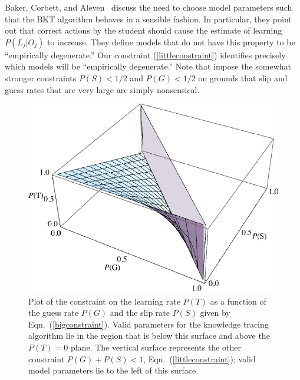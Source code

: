 \documentclass[jedm,acmnow]{acmtrans2m}
\begin{document}
Baker, Corbett, and Aleven~\citeyear{baker_more_2008} discuss the need
to choose model parameters such that the BKT algorithm behaves in a sensible
fashion.  In particular, they point out that correct actions by
the student should cause the estimate of learning
$P(L_j|O_j)$ to increase.  They define models that do not have
this property to be ``empirically degenerate.''   Our constraint
(\ref{littleconstraint}) identifies precisely which models will be ``empirically
degenerate.''  Note that \cite{baker_more_2008} impose the somewhat
stronger constraints $P(S)<1/2$ and $P(G)<1/2$ on grounds that slip and
guess rates that are very large are simply nonsensical.


\begin{figure}
\centering\includegraphics{region}
\caption{
  Plot of the constraint on the learning rate $P(T)$ as a function of the  guess rate $P(G)$ and the
  slip rate $P(S)$ given by Eqn.~(\ref{bigconstraint}).  Valid
  parameters for the knowledge tracing algorithm lie in the region 
  that is below this surface and above the $P(T)=0$ plane.  The
  vertical surface represents the other constraint $ P(G)+P(S)< 1 $,
  Eqn.~(\ref{littleconstraint}); valid model parameters lie to the left of this surface.
}
 \label{region}
\end{figure}
\end{document}
